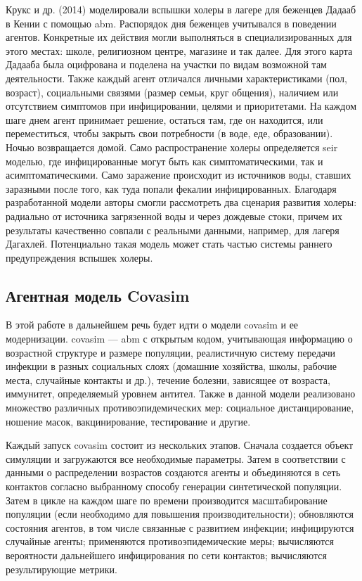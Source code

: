 \documentclass[a4paper,12pt]{article} %
\begin{document}
Крукс и др. (2014) \cite{crooks2014agent} моделировали вспышки холеры в лагере для беженцев Дадааб в Кении с помощью \gls{abm}. Распорядок дня беженцев учитывался в поведении агентов. Конкретные их действия могли выполняться в специализированных для этого местах: школе, религиозном центре, магазине и так далее. Для этого карта Дадааба была оцифрована и поделена на участки по видам возможной там деятельности. Также каждый агент отличался личными характеристиками (пол, возраст), социальными связями (размер семьи, круг общения), наличием или отсутствием симптомов при инфицировании, целями и приоритетами. На каждом шаге днем агент принимает решение, остаться там, где он находится, или переместиться, чтобы закрыть свои потребности (в воде, еде, образовании). Ночью возвращается домой. Само распространение холеры определяется \gls{seir} моделью, где инфицированные могут быть как симптоматическими, так и асимптоматическими. Само заражение происходит из источников воды, ставших заразными после того, как туда попали фекалии инфицированных. Благодаря разработанной модели авторы смогли рассмотреть два сценария развития холеры: радиально от источника загрязенной воды и через дождевые стоки, причем их результаты качественно совпали с реальными данными, например, для лагеря Дагахлей. Потенциально такая модель может стать частью системы раннего предупреждения вспышек холеры.




\subsection{Агентная модель Covasim}

В этой работе в дальнейшем речь будет идти о модели \gls{covasim} и ее модернизации. \gls{covasim} --- \gls{abm} с открытым кодом, учитывающая информацию о возрастной структуре и размере популяции, реалистичную систему передачи инфекции в разных социальных слоях (домашние хозяйства, школы, рабочие места, случайные контакты и др.), течение болезни, зависящее от возраста, иммунитет, определяемый уровнем антител. Также в данной модели реализовано множество различных противоэпидемических мер: социальное дистанцирование, ношение масок, вакцинирование, тестирование и другие.

Каждый запуск \gls{covasim} состоит из нескольких этапов. Сначала создается объект симуляции и загружаются все необходимые параметры. Затем в соответствии с данными о распределении возрастов создаются агенты и объединяются в сеть контактов согласно выбранному способу генерации синтетической популяции. Затем в цикле на каждом шаге по времени производится масштабирование популяции (если необходимо для повышения производительности); обновляются состояния агентов, в том числе связанные с развитием инфекции; инфицируются случайные агенты; применяются противоэпидемические меры; вычисляются вероятности дальнейшего инфицирования по сети контактов; вычисляются результирующие метрики.
\end{document}
